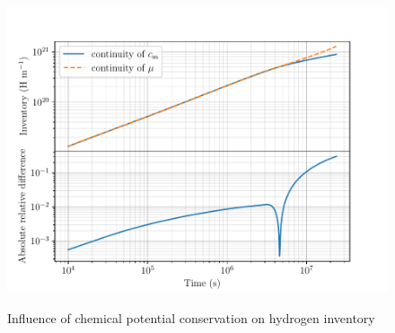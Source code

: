 \begin{figure}
    \centering
    \includegraphics[width=\linewidth]{Figures/Chapter3/monoblocks/interface_condition/iter case/comparison_inventory_2d.pdf}
    \label{fig: 2D inventories}
    \caption{Influence of chemical potential conservation on hydrogen inventory}
\end{figure}


